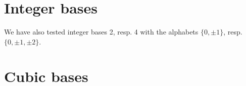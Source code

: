 \section{Integer bases}
We have also tested integer bases 2, resp. 4 with the alphabets $\{0,\pm 1\}$, resp. $\{0,\pm 1, \pm 2\}$.



\section{Cubic bases}

